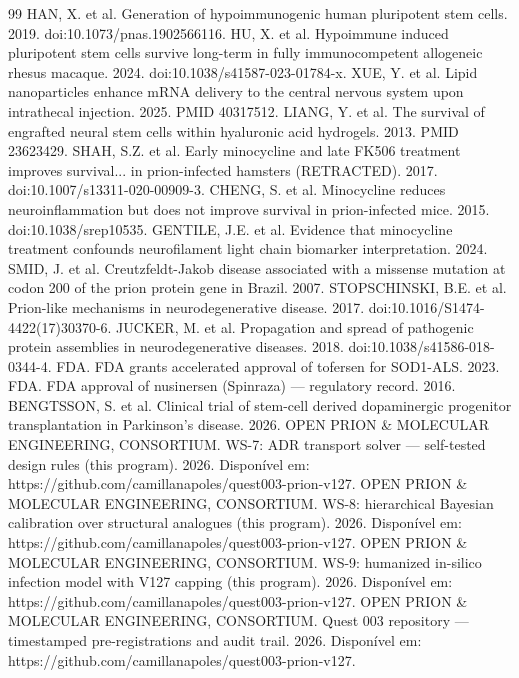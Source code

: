\documentclass[12pt,a4paper,oneside]{report}
\begin{document}
\begin{thebibliography}{99}
 HAN, X. et al. Generation of hypoimmunogenic human pluripotent stem cells. 2019. doi:10.1073/pnas.1902566116.
 HU, X. et al. Hypoimmune induced pluripotent stem cells survive long-term in fully immunocompetent allogeneic rhesus macaque. 2024. doi:10.1038/s41587-023-01784-x.
 XUE, Y. et al. Lipid nanoparticles enhance mRNA delivery to the central nervous system upon intrathecal injection. 2025. PMID 40317512.
 LIANG, Y. et al. The survival of engrafted neural stem cells within hyaluronic acid hydrogels. 2013. PMID 23623429.
 SHAH, S.Z. et al. Early minocycline and late FK506 treatment improves survival... in prion-infected hamsters (RETRACTED). 2017. doi:10.1007/s13311-020-00909-3.
 CHENG, S. et al. Minocycline reduces neuroinflammation but does not improve survival in prion-infected mice. 2015. doi:10.1038/srep10535.
 GENTILE, J.E. et al. Evidence that minocycline treatment confounds neurofilament light chain biomarker interpretation. 2024.
 SMID, J. et al. Creutzfeldt-Jakob disease associated with a missense mutation at codon 200 of the prion protein gene in Brazil. 2007.
 STOPSCHINSKI, B.E. et al. Prion-like mechanisms in neurodegenerative disease. 2017. doi:10.1016/S1474-4422(17)30370-6.
 JUCKER, M. et al. Propagation and spread of pathogenic protein assemblies in neurodegenerative diseases. 2018. doi:10.1038/s41586-018-0344-4.
 FDA. FDA grants accelerated approval of tofersen for SOD1-ALS. 2023.
 FDA. FDA approval of nusinersen (Spinraza) — regulatory record. 2016.
 BENGTSSON, S. et al. Clinical trial of stem-cell derived dopaminergic progenitor transplantation in Parkinson's disease. 2026.
 OPEN PRION \& MOLECULAR ENGINEERING, CONSORTIUM. WS-7: ADR transport solver — self-tested design rules (this program). 2026. Disponível em: https://github.com/camillanapoles/quest003-prion-v127.
 OPEN PRION \& MOLECULAR ENGINEERING, CONSORTIUM. WS-8: hierarchical Bayesian calibration over structural analogues (this program). 2026. Disponível em: https://github.com/camillanapoles/quest003-prion-v127.
 OPEN PRION \& MOLECULAR ENGINEERING, CONSORTIUM. WS-9: humanized in-silico infection model with V127 capping (this program). 2026. Disponível em: https://github.com/camillanapoles/quest003-prion-v127.
 OPEN PRION \& MOLECULAR ENGINEERING, CONSORTIUM. Quest 003 repository — timestamped pre-registrations and audit trail. 2026. Disponível em: https://github.com/camillanapoles/quest003-prion-v127.

\end{thebibliography}
\end{document}
